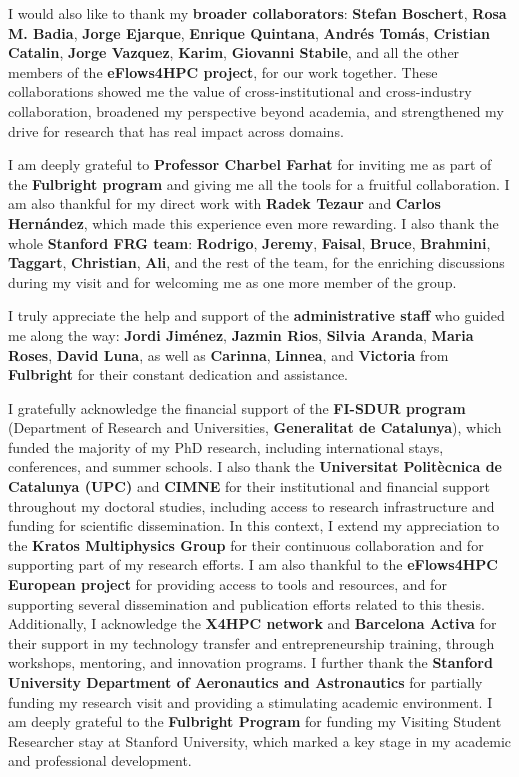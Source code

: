 I would also like to thank my \textbf{broader collaborators}: \textbf{Stefan Boschert}, \textbf{Rosa M. Badia}, \textbf{Jorge Ejarque}, \textbf{Enrique Quintana}, \textbf{Andrés Tomás}, \textbf{Cristian Catalin}, \textbf{Jorge Vazquez}, \textbf{Karim}, \textbf{Giovanni Stabile}, and all the other members of the \textbf{eFlows4HPC project}, for our work together. These collaborations showed me the value of cross-institutional and cross-industry collaboration, broadened my perspective beyond academia, and strengthened my drive for research that has real impact across domains.

I am deeply grateful to \textbf{Professor Charbel Farhat} for inviting me as part of the \textbf{Fulbright program} and giving me all the tools for a fruitful collaboration. I am also thankful for my direct work with \textbf{Radek Tezaur} and \textbf{Carlos Hernández}, which made this experience even more rewarding. I also thank the whole \textbf{Stanford FRG team}: \textbf{Rodrigo}, \textbf{Jeremy}, \textbf{Faisal}, \textbf{Bruce}, \textbf{Brahmini}, \textbf{Taggart}, \textbf{Christian}, \textbf{Ali}, and the rest of the team, for the enriching discussions during my visit and for welcoming me as one more member of the group.

I truly appreciate the help and support of the \textbf{administrative staff} who guided me along the way: \textbf{Jordi Jiménez}, \textbf{Jazmin Rios}, \textbf{Silvia Aranda}, \textbf{Maria Roses}, \textbf{David Luna}, as well as \textbf{Carinna}, \textbf{Linnea}, and \textbf{Victoria} from \textbf{Fulbright} for their constant dedication and assistance.

I gratefully acknowledge the financial support of the \textbf{FI-SDUR program} (Department of Research and Universities, \textbf{Generalitat de Catalunya}), which funded the majority of my PhD research, including international stays, conferences, and summer schools. I also thank the \textbf{Universitat Politècnica de Catalunya (UPC)} and \textbf{CIMNE} for their institutional and financial support throughout my doctoral studies, including access to research infrastructure and funding for scientific dissemination. In this context, I extend my appreciation to the \textbf{Kratos Multiphysics Group} for their continuous collaboration and for supporting part of my research efforts. I am also thankful to the \textbf{eFlows4HPC European project} for providing access to tools and resources, and for supporting several dissemination and publication efforts related to this thesis. Additionally, I acknowledge the \textbf{X4HPC network} and \textbf{Barcelona Activa} for their support in my technology transfer and entrepreneurship training, through workshops, mentoring, and innovation programs. I further thank the \textbf{Stanford University Department of Aeronautics and Astronautics} for partially funding my research visit and providing a stimulating academic environment.  I am deeply grateful to the \textbf{Fulbright Program} for funding my Visiting Student Researcher stay at Stanford University, which marked a key stage in my academic and professional development.

